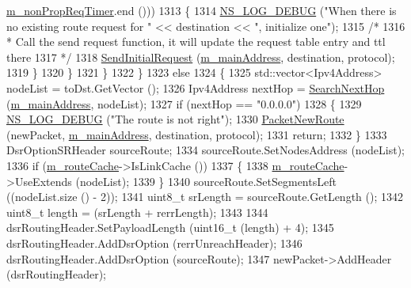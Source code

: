 \begin{DoxyCode}
      \hyperlink{classns3_1_1dsr_1_1DsrRouting_a0936df610f90f7e79c24a2a8cdea6c14}{m\_nonPropReqTimer}.end ()))
1313               \{
1314                 \hyperlink{group__logging_ga413f1886406d49f59a6a0a89b77b4d0a}{NS\_LOG\_DEBUG} (\textcolor{stringliteral}{"When there is no existing route request for "} << destination << \textcolor{stringliteral}{
      ", initialize one"});
1315                 \textcolor{comment}{/*}
1316 \textcolor{comment}{                 * Call the send request function, it will update the request table entry and ttl there}
1317 \textcolor{comment}{                 */}
1318                 \hyperlink{classns3_1_1dsr_1_1DsrRouting_a74777d1806e768fccc1c2fe169b42c98}{SendInitialRequest} (\hyperlink{classns3_1_1dsr_1_1DsrRouting_a73182b5edee2d8460f28855e058fc9a0}{m\_mainAddress}, destination, protocol);
1319               \}
1320           \}
1321       \}
1322     \}
1323   \textcolor{keywordflow}{else}
1324     \{
1325       std::vector<Ipv4Address> nodeList = toDst.GetVector ();
1326       Ipv4Address nextHop = \hyperlink{classns3_1_1dsr_1_1DsrRouting_aa1b16658c14499af76ca7dd69c034f22}{SearchNextHop} (\hyperlink{classns3_1_1dsr_1_1DsrRouting_a73182b5edee2d8460f28855e058fc9a0}{m\_mainAddress}, nodeList);
1327       \textcolor{keywordflow}{if} (nextHop == \textcolor{stringliteral}{"0.0.0.0"})
1328         \{
1329           \hyperlink{group__logging_ga413f1886406d49f59a6a0a89b77b4d0a}{NS\_LOG\_DEBUG} (\textcolor{stringliteral}{"The route is not right"});
1330           \hyperlink{classns3_1_1dsr_1_1DsrRouting_ae70ab39db551d1d81afc081196f78017}{PacketNewRoute} (newPacket, \hyperlink{classns3_1_1dsr_1_1DsrRouting_a73182b5edee2d8460f28855e058fc9a0}{m\_mainAddress}, destination, protocol);
1331           \textcolor{keywordflow}{return};
1332         \}
1333       DsrOptionSRHeader sourceRoute;
1334       sourceRoute.SetNodesAddress (nodeList);
1336       \textcolor{keywordflow}{if} (\hyperlink{classns3_1_1dsr_1_1DsrRouting_ac409bdb961b9fff0fb63ebd026be99ad}{m\_routeCache}->IsLinkCache ())
1337         \{
1338           \hyperlink{classns3_1_1dsr_1_1DsrRouting_ac409bdb961b9fff0fb63ebd026be99ad}{m\_routeCache}->UseExtends (nodeList);
1339         \}
1340       sourceRoute.SetSegmentsLeft ((nodeList.size () - 2));
1341       uint8\_t srLength = sourceRoute.GetLength ();
1342       uint8\_t length = (srLength + rerrLength);
1343 
1344       dsrRoutingHeader.SetPayloadLength (uint16\_t (length) + 4);
1345       dsrRoutingHeader.AddDsrOption (rerrUnreachHeader);
1346       dsrRoutingHeader.AddDsrOption (sourceRoute);
1347       newPacket->AddHeader (dsrRoutingHeader);

\end{DoxyCode}
